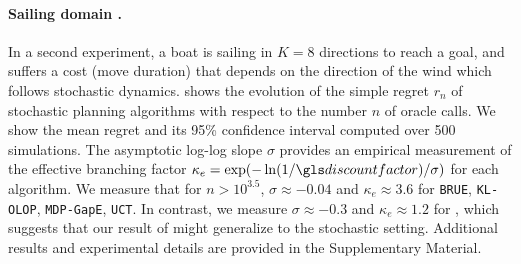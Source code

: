 \paragraph{Sailing domain \citep{Vanderbei1996}.}
In a second experiment, a boat is sailing in $K=8$ directions to reach a goal, and suffers a cost (move duration) that depends on the direction of the wind which follows stochastic dynamics.  shows the evolution of the simple regret $r_n$ of stochastic planning algorithms with respect to the number $n$ of oracle calls. We show the mean regret and its 95\% confidence interval computed over 500 simulations. The asymptotic log-log slope $\sigma$ provides an empirical measurement of the effective branching factor $\kappa_e = \exp(-\log(1/\discount)/\sigma)$ for each algorithm. We measure that for $n>10^{3.5}$, $\sigma \approx-0.04$ and $\kappa_e \approx 3.6$ for \texttt{BRUE}, \texttt{KL-OLOP}, \texttt{MDP-GapE}, \texttt{UCT}. In contrast, we measure $\sigma \approx-0.3$ and $\kappa_e \approx 1.2$ for \GBOP, which suggests that our result of  might generalize to the stochastic setting. Additional results and experimental details are provided in the Supplementary Material.

